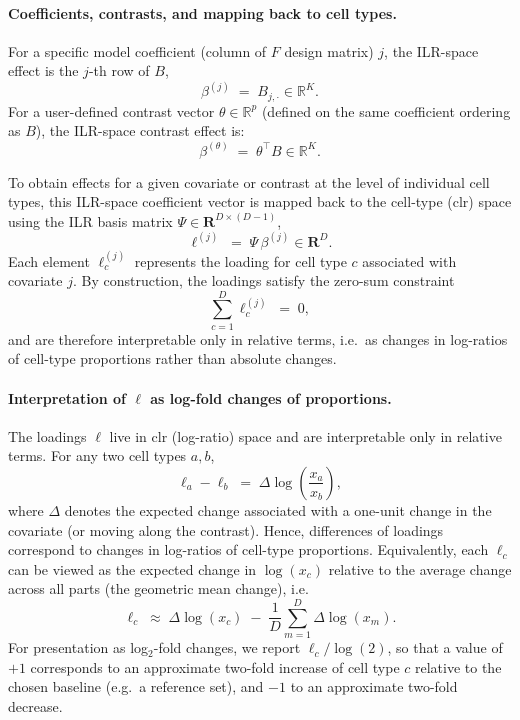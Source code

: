\documentclass{article}
\begin{document}
\paragraph{Coefficients, contrasts, and mapping back to cell types.}
For a specific model coefficient (column of $F$ design matrix) $j$, the ILR-space effect is the $j$-th row of $B$,
\begin{equation}
\beta^{(j)} \;=\; B_{j,\cdot} \in \mathbb{R}^{K}.
\end{equation}
For a user-defined contrast vector $\theta \in \mathbb{R}^{p}$ (defined on the same coefficient ordering as $B$), the ILR-space contrast effect is:
\begin{equation}
\beta^{(\theta)} \;=\; \theta^\top B \in \mathbb{R}^{K}.
\end{equation}

To obtain effects for a given covariate or contrast at the level of individual cell types, this ILR-space
coefficient vector is mapped back to the cell-type (clr) space using the
ILR basis matrix $\Psi \in \mathbf{R}^{D \times (D-1)}$,
\begin{equation}
\ell^{(j)} \;=\; \Psi\,\beta^{(j)} \in \mathbf{R}^{D}.
\end{equation}
Each element $\ell^{(j)}_c$ represents the loading for cell type $c$
associated with covariate $j$. By construction, the loadings satisfy the
zero-sum constraint
\begin{equation}
\sum_{c=1}^{D} \ell^{(j)}_c \;=\; 0,
\end{equation}
and are therefore interpretable only in relative terms, i.e.\ as changes
in log-ratios of cell-type proportions rather than absolute changes.


\paragraph{Interpretation of $\ell$ as log-fold changes of proportions.}
The loadings $\ell$ live in clr (log-ratio) space and are interpretable only in relative terms. For any two cell types $a,b$,
\begin{equation}
\ell_a - \ell_b
\;=\;
\Delta \log\!\left(\frac{x_a}{x_b}\right),
\end{equation}
where $\Delta$ denotes the expected change associated with a one-unit change in the covariate (or moving along the contrast). Hence, differences of loadings correspond to changes in log-ratios of cell-type proportions. Equivalently, each $\ell_c$ can be viewed as the expected change in $\log(x_c)$ relative to the average change across all parts (the geometric mean change), i.e.
\begin{equation}
\ell_c
\;\approx\;
\Delta \log(x_c)
\;-\;
\frac{1}{D}\sum_{m=1}^{D}\Delta \log(x_m).
\end{equation}
For presentation as log$_2$-fold changes, we report $\ell_c/\log(2)$, so that a value of $+1$ corresponds to an approximate two-fold increase of cell type $c$ relative to the chosen baseline (e.g.\ a reference set), and $-1$ to an approximate two-fold decrease.
\end{document}
